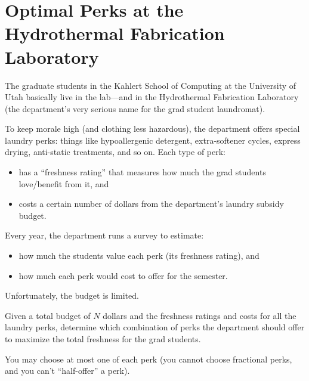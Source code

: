 \section*{Optimal Perks at the Hydrothermal Fabrication Laboratory}

The graduate students in the Kahlert School of Computing at the University of
Utah basically live in the lab---and in the Hydrothermal Fabrication Laboratory
(the department's very serious name for the grad student laundromat).

To keep morale high (and clothing less hazardous), the department offers special
laundry perks: things like hypoallergenic detergent, extra-softener cycles,
express drying, anti-static treatments, and so on. Each type of perk:
\begin{itemize}
    \item has a ``freshness rating'' that measures how much the grad students
    love/benefit from it, and
    \item costs a certain number of dollars from the department's laundry
    subsidy budget.
\end{itemize}

Every year, the department runs a survey to estimate:
\begin{itemize}
    \item how much the students value each perk (its freshness rating), and
    \item how much each perk would cost to offer for the semester.
\end{itemize}

Unfortunately, the budget is limited.

\medskip

\noindent
Given a total budget of \(N\) dollars and the freshness ratings and costs for
all the laundry perks, determine which combination of perks the department
should offer to maximize the total freshness for the grad students.

You may choose at most one of each perk (you cannot choose fractional perks, and
you can't ``half-offer'' a perk).